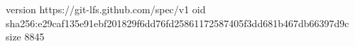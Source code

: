 version https://git-lfs.github.com/spec/v1
oid sha256:e29caf135e91ebf201829f6dd76fd25861172587405f3dd681b467db66397d9c
size 8845
